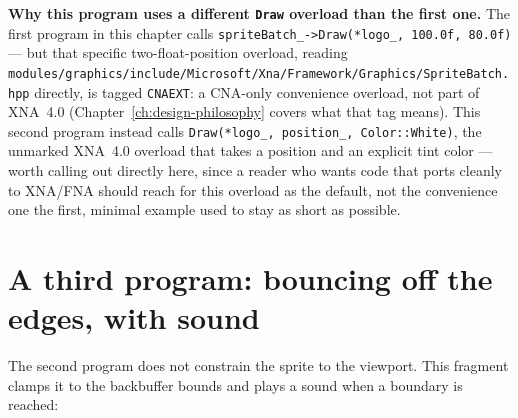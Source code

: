 \begin{sourcenote}
\textbf{Why this program uses a different \texttt{Draw} overload than the first one.} The
first program in this chapter calls \texttt{spriteBatch\_->Draw(*logo\_, 100.0f, 80.0f)} ---
but that specific two-float-position overload, reading
\texttt{modules/graphics/include/\allowbreak{}Microsoft/\allowbreak{}Xna/\allowbreak{}Framework/\allowbreak{}Graphics/\allowbreak{}SpriteBatch.hpp} directly, is tagged
\texttt{CNAEXT}: a CNA-only convenience overload, not part of XNA~4.0
(Chapter~\ref{ch:design-philosophy} covers what that tag means). This second program instead
calls \texttt{Draw(*logo\_, position\_, Color::White)}, the unmarked XNA~4.0 overload
that takes a  position and an explicit tint color --- worth calling out
directly here, since a reader who wants code that ports cleanly to XNA/FNA should reach
for this overload as the default, not the convenience one the first, minimal example used to
stay as short as possible.
\end{sourcenote}

\section{A third program: bouncing off the edges, with sound}

The second program does not constrain the sprite to the viewport. This fragment clamps it to the
backbuffer bounds and plays a sound when a boundary is reached:

